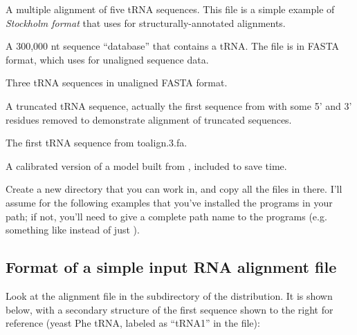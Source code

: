   \begin{sreitems}{}
  \item[\prog{trna.5.sto}] A multiple alignment of five tRNA
       sequences. This file is a simple example of \emph{Stockholm
       format} that  uses for structurally-annotated alignments.
  \item[\prog{tosearch.300Kb.db}]  A 300,000 nt sequence ``database''
       that contains a tRNA. The file is
       in FASTA format, which  uses for unaligned sequence
       data.
  \item[\prog{toalign.3.fa}] Three tRNA sequences
    in unaligned FASTA format.
  \item[\prog{toalign.1trunc.fa}] A truncated tRNA sequence, actually
       the first sequence from  with some 5' and 3'
       residues removed to demonstrate alignment of truncated
       sequences.
  \item[\prog{toalign.1.fa}] The first tRNA sequence from toalign.3.fa.
  \item[\prog{my.c.cm}] A calibrated version of a model built from
       , included to save time. 
  \end{sreitems}

Create a new directory that you can work in, and copy all the files in
 there. I'll assume for the following examples that you've
installed the  programs in your path; if not, you'll need to give
a complete path name to the programs (e.g. something like 
\newline
{} 
instead of just ).

\subsection{Format of a simple input RNA alignment file}

Look at the alignment file  in the 
subdirectory of the  distribution. It is shown
below, with a secondary structure of the first sequence shown to the
right for reference (yeast Phe tRNA, labeled as ``tRNA1'' in the
file):

